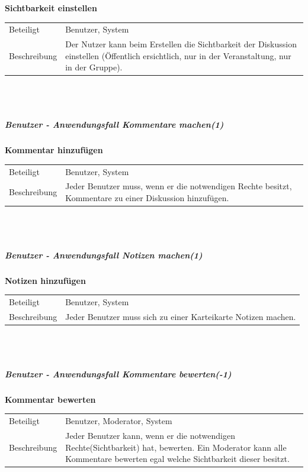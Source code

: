 \documentclass[12pt,a4paper]{article}
\begin{document}
\textbf{Sichtbarkeit einstellen}\\
\begin{tabular}{l|p{12cm}}
\hline 
Beteiligt & Benutzer, System \\ 
Beschreibung & Der Nutzer kann beim Erstellen die Sichtbarkeit der Diskussion einstellen (Öffentlich ersichtlich, nur in der Veranstaltung, nur in der Gruppe). \\ 
\end{tabular}\\\\


\subparagraph{Benutzer - Anwendungsfall \glqq Kommentare machen\grqq (1)}\mbox{}

\textbf{Kommentar hinzufügen}\\
\begin{tabular}{l|p{12cm}}
\hline 
Beteiligt & Benutzer, System \\ 
Beschreibung & Jeder Benutzer muss, wenn er die notwendigen Rechte besitzt, Kommentare zu einer Diskussion hinzufügen. \\ 
\end{tabular}\\\\ 


\subparagraph{Benutzer - Anwendungsfall \glqq Notizen machen\grqq (1)}\mbox{}

\textbf{Notizen hinzufügen}\\
\begin{tabular}{l|p{12cm}}
\hline 
Beteiligt & Benutzer, System \\ 
Beschreibung & Jeder Benutzer muss sich zu einer Karteikarte Notizen machen. \\ 
\end{tabular}\\\\


\subparagraph{Benutzer - Anwendungsfall \glqq Kommentare bewerten\grqq (-1)}\mbox{}

\textbf{Kommentar bewerten}\\
\begin{tabular}{l|p{12cm}}
\hline 
Beteiligt & Benutzer, Moderator, System \\ 
Beschreibung & Jeder Benutzer kann, wenn er die notwendigen Rechte(Sichtbarkeit) hat, bewerten. Ein Moderator kann alle Kommentare  bewerten egal welche Sichtbarkeit dieser besitzt. \\ 
\end{tabular}\\\\
\end{document}
